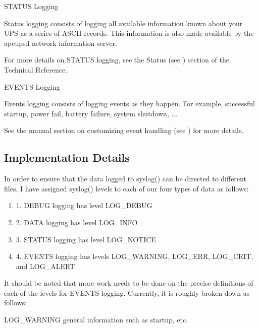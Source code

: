 {{{{{{{{{\small{STATUS Logging}

Status logging consists of logging all available information known about your
UPS as a series of ASCII records. This information is also made available by
the apcupsd network information server.  

For more details on STATUS logging, see the Status (see 
) section of
the Technical Reference. 

\small{EVENTS Logging}

Events logging consists of logging events as they happen. For example,
successful startup, power fail, battery failure, system shutdown, ...  

See the manual section on customizing event handling (see 
) for
more details. 

\label{Implementation-Details}

\subsection*{Implementation Details}

In order to ensure that the data logged to syslog() can be directed to
different files, I have assigned syslog() levels to each of our four types of
data as follows:  

\begin{enumerate}
\item 1. DEBUG logging has level LOG\_DEBUG  
\item 2. DATA logging has level LOG\_INFO  
\item 3. STATUS logging has level LOG\_NOTICE  
\item 4. EVENTS logging has levels LOG\_WARNING, LOG\_ERR, LOG\_CRIT, and
   LOG\_ALERT  
   \end{enumerate}

It should be noted that more work needs to be done on the precise definitions
of each of the levels for EVENTS logging. Currently, it is roughly broken down
as follows:  

LOG\_WARNING general information such as startup, etc.  

}}}}}}}}}
